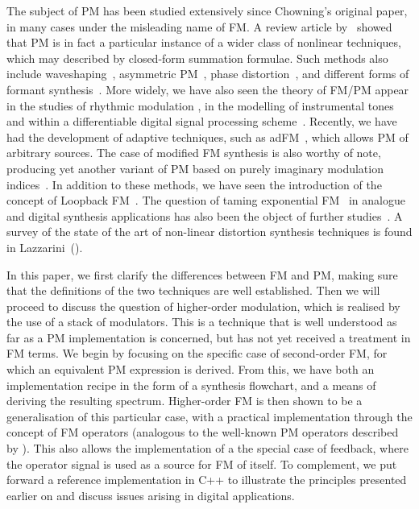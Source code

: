 \documentclass[]{interact}
\begin{document}
The subject of PM has been studied extensively since Chowning's original paper, in many cases under the misleading name of FM. A review article by~\cite{MoorerIEEE} showed that PM is in fact a particular instance of a wider class of nonlinear techniques, which may described by closed-form summation formulae. Such methods also include waveshaping~\citep{LeBrunWaveshaping}, 
asymmetric PM~\citep{palamin1988a}, phase distortion~\citep{LazzariniPD}, and different forms of formant synthesis~\citep{Lazzarini2017}. More widely, we have also seen the theory of FM/PM appear in the studies of rhythmic modulation \citep{Waadeland}, in the modelling of instrumental tones \citep{Horner1998,Horner1997,Horner1996} and within a differentiable digital signal processing scheme~\citep{DDX7}. 
Recently, we have had the development of adaptive techniques, such as adFM~\citep{LazzariniADFM}, which allows PM of arbitrary sources. The case of modified FM synthesis is also worthy of note, producing yet another variant of PM based on purely imaginary modulation indices~\citep{Lazzarini2010theory}. In addition to these methods, we have seen the introduction of the concept of Loopback FM~\citep{Smyth, Loopback}. The question of taming exponential FM~\citep{HutchinsXFM} in analogue and digital synthesis applications has also been the object of further studies~\citep{TimoneyEFM,Nielsen}. A survey of the state of the art of non-linear distortion synthesis techniques is found in Lazzarini~(\citeyear[chap.8]{Lazzarini2021}).

In this paper, we first clarify the differences between FM and PM, making sure that the definitions of the two techniques are well established. Then we will proceed to discuss the question of higher-order modulation, which is realised by the use of a stack of modulators. This is a technique that is well understood as far as a PM implementation is concerned, but has not yet received a treatment in FM terms. We begin by focusing on the specific case of second-order FM, for which an equivalent PM expression is derived. From this, we have both an implementation recipe in the form of a synthesis flowchart, and a means of deriving the resulting spectrum. Higher-order FM is then shown to be a generalisation of this particular case, with a practical implementation
through the concept of FM operators (analogous to the well-known PM operators described by \cite{FMTheory}). This also allows the implementation of a the special case of feedback, where the operator signal is used as a source for FM of itself. To complement, we put forward a reference implementation in C++ to illustrate the principles presented earlier on and discuss issues arising in digital applications.
\end{document}
